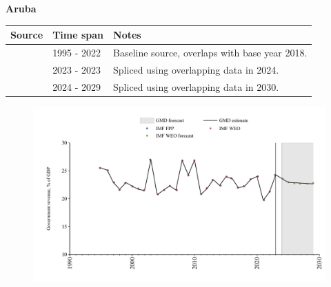 \documentclass[12pt,a4paper,landscape]{article}
\begin{document}
\begin{adjustbox}{max totalsize={\paperwidth}{\paperheight},center}
\begin{minipage}[t][\textheight][t]{\textwidth}
\vspace*{0.5cm}
{}
\begin{center}
{\Large\bfseries Aruba}
\end{center}
\vspace{0.5cm}
\begin{table}[H]
\centering
\small
\begin{tabular}{|l|l|l|}
\hline
\textbf{Source} & \textbf{Time span} & \textbf{Notes} \\
\hline
\rowcolor{white}\cite{IMF_WEO}& 1995 - 2022 &Baseline source, overlaps with base year 2018.\\
\rowcolor{lightgray}\cite{IMF_FPP}& 2023 - 2023 &Spliced using overlapping data in 2024.\\
\rowcolor{white}\cite{IMF_WEO_forecast}& 2024 - 2029 &Spliced using overlapping data in 2030.\\
\hline
\end{tabular}
\end{table}
\begin{figure}[H]
\centering
\includegraphics[width=\textwidth,height=0.6\textheight,keepaspectratio]{graphs/ABW_govrev_GDP.pdf}
\end{figure}
\end{minipage}
\end{adjustbox}
\end{document}
